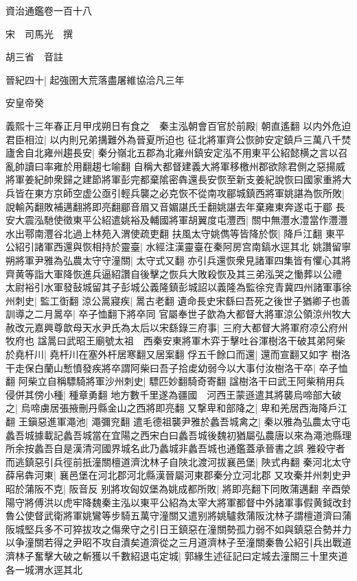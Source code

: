 資治通鑑卷一百十八


宋　司馬光　撰

胡三省　音註

晉紀四十|{
	起強圉大荒落盡屠維協洽凡三年}


安皇帝癸

義熙十三年春正月甲戌朔日有食之　秦主泓朝會百官於前殿|{
	朝直遙翻}
以内外危迫君臣相泣|{
	以内則兄弟搆難外為晉夏所迫也}
征北將軍齊公恢帥安定鎮戶三萬八千焚廬舍自北雍州趨長安|{
	秦分嶺北五郡為北雍州鎮安定泓不用東平公紹懿横之言以召亂帥讀曰率雍於用翻趨七喻翻}
自稱大都督建義大將軍移檄州郡欲除君側之惡揚威將軍姜紀帥衆歸之建節將軍彭完都棄隂密犇還長安恢至新支姜紀說恢曰國家重將大兵皆在東方京師空虚公亟引輕兵襲之必克恢不從南攻郿城鎮西將軍姚諶為恢所敗|{
	說輸芮翻敗補邁翻將即亮翻郿音眉又音媚諶氏壬翻姚諶去年棄雍東奔遂屯于郿}
長安大震泓馳使徵東平公紹遣姚裕及輔國將軍胡翼度屯灃西|{
	關中無灃水澧當作灃灃水出鄠南灃谷北過上林苑入渭使疏吏翻}
扶風太守姚儁等皆降於恢|{
	降戶江翻}
東平公紹引諸軍西還與恢相持於靈臺|{
	水經注漢靈臺在秦阿房宫南鎬水逕其北}
姚讚留寧朔將軍尹雅為弘農太守守潼關|{
	太守式又翻}
亦引兵還恢衆見諸軍四集皆有懼心其將齊黄等詣大軍降恢進兵逼紹讚自後擊之恢兵大敗殺恢及其三弟泓哭之慟葬以公禮　太尉裕引水軍發鼔城留其子彭城公義隆鎮彭城詔以義隆為監徐兖青冀四州諸軍事徐州刺史|{
	監工衘翻}
涼公暠寢疾|{
	暠古老翻}
遺命長史宋繇曰吾死之後世子猶卿子也善訓導之二月暠卒|{
	卒子恤翻下將卒同}
官屬奉世子歆為大都督大將軍涼公領涼州牧大赦改元嘉興尊歆母天水尹氏為太后以宋繇錄三府事|{
	三府大都督大將軍府凉公府州牧府也}
諡暠曰武昭王廟號太祖　西秦安東將軍木弈于擊吐谷渾樹洛干破其弟阿柴於堯杆川|{
	堯杆川在塞外杆居寒翻又居案翻}
俘五千餘口而還|{
	還而宣翻又如字}
樹洛干走保白蘭山慙憤發疾將卒謂阿柴曰吾子拾䖍幼弱今以大事付汝樹洛干卒|{
	卒子恤翻}
阿柴立自稱驃騎將軍沙州刺史|{
	驃匹妙翻騎奇寄翻}
諡樹洛干曰武王阿柴稍用兵侵併其傍小種|{
	種章勇翻}
地方數千里遂為疆國　河西王蒙遜遣其將襲烏啼部大破之|{
	烏啼虜居張掖刪丹縣金山之西將即亮翻}
又撃卑和部降之|{
	卑和羌居西海降戶江翻}
王鎭惡進軍澠池|{
	澠彌兖翻}
遣毛德祖襲尹雅於蠡吾城禽之|{
	秦以雅為弘農太守屯蠡吾城據載記蠡吾城當在宜陽之西宋白曰蠡吾城後魏初猶屬弘農唐以來為澠池縣理所余按蠡吾自是漢清河國界城名此乃蠡城非蠡吾城也通鑑蓋承晉書之誤}
雅殺守者而逃鎮惡引兵徑前扺潼關檀道濟沈林子自陜北渡河拔襄邑堡|{
	陜式冉翻}
秦河北太守薛帛犇河東|{
	襄邑堡在河北郡河北縣漢晉屬河東郡秦分立河北郡}
又攻秦并州刺史尹昭於蒲阪不克|{
	阪音反}
别將攻匈奴堡為姚成都所敗|{
	將即亮翻下同敗蒲邁翻}
辛酉滎陽守將傅洪以虎牢降魏秦主泓以東平公紹為太宰大將軍都督中外諸軍事假黄鉞改封魯公使督武衛將軍姚鸞等步騎五萬守潼關又遣别將姚驢救蒲阪沈林子謂檀道濟曰蒲阪城堅兵多不可猝拔攻之傷衆守之引日王鎮惡在潼關勢孤力弱不如與鎮惡合勢并力以争潼關若得之尹昭不攻自潰矣道濟從之三月道濟林子至潼關秦魯公紹引兵出戰道濟林子奮擊大破之斬獲以千數紹退屯定城|{
	郭緣生述征記曰定城去潼關三十里夾道各一城渭水逕其北}
